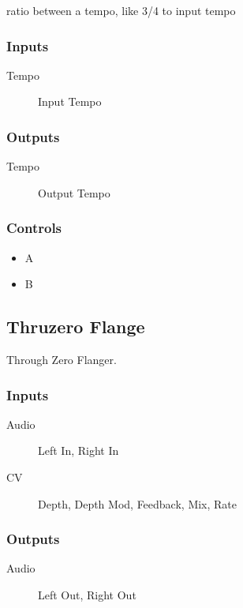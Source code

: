ratio between a tempo, like 3/4 to input tempo



\subsubsection{Inputs}
\begin{description}
\item [Tempo] Input Tempo
\end{description}

\subsubsection{Outputs}
\begin{description}
\item [Tempo] Output Tempo
\end{description}

\subsubsection{Controls}
\begin{itemize}
\item A
\item B
\end{itemize}

\subsection{Thruzero Flange}

Through Zero Flanger.



\subsubsection{Inputs}
\begin{description}
\item [Audio] Left In, Right In
\item [CV] Depth, Depth Mod, Feedback, Mix, Rate
\end{description}

\subsubsection{Outputs}
\begin{description}
\item [Audio] Left Out, Right Out
\end{description}

